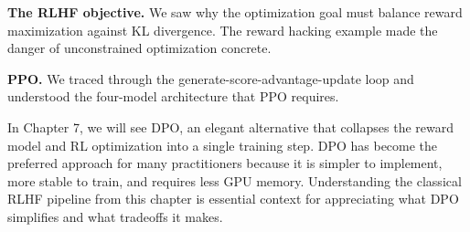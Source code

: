 \begin{chapterenv}
\textbf{The RLHF objective.} We saw why the optimization goal must balance reward maximization against KL divergence. The reward hacking example made the danger of unconstrained optimization concrete.

\textbf{PPO.} We traced through the generate-score-advantage-update loop and understood the four-model architecture that PPO requires.

In Chapter 7, we will see DPO, an elegant alternative that collapses the reward model and RL optimization into a single training step. DPO has become the preferred approach for many practitioners because it is simpler to implement, more stable to train, and requires less GPU memory. Understanding the classical RLHF pipeline from this chapter is essential context for appreciating what DPO simplifies and what tradeoffs it makes.

\end{chapterenv}